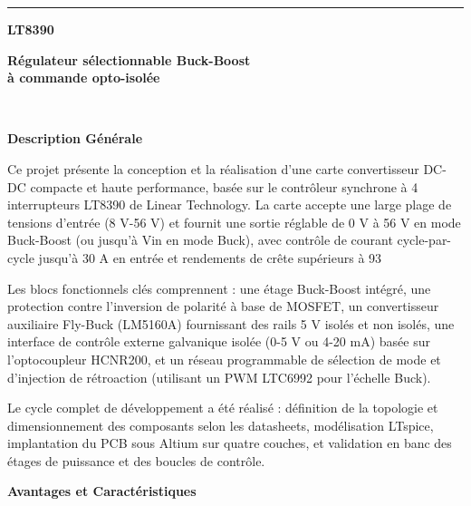\begin{titlepage}
	\noindent\rule{\textwidth}{1pt}
    \noindent
    \begin{minipage}[t]{0.48\textwidth}
      \textbf{LT8390}
    \end{minipage}%
    \hfill%
    \begin{minipage}[t]{0.48\textwidth}
      \raggedleft
      \textbf{Régulateur sélectionnable Buck-Boost} \\
	  \textbf{à commande opto-isolée}
    \end{minipage}\\[0.5em]

    \vspace{1cm}

    \noindent
    \begin{minipage}[t]{0.48\textwidth}
	\textbf{Description Générale}

	\vspace{0.5cm}

	Ce projet présente la conception et la réalisation d'une carte convertisseur DC-DC compacte et haute performance, basée sur le contrôleur synchrone à 4 interrupteurs LT8390 de Linear Technology. La carte accepte une large plage de tensions d'entrée (8 V-56 V) et fournit une sortie réglable de 0 V à 56 V en mode Buck-Boost (ou jusqu'à Vin en mode Buck), avec contrôle de courant cycle-par-cycle jusqu'à 30 A en entrée et rendements de crête supérieurs à 93 %

	\vspace{0.3cm}

	Les blocs fonctionnels clés comprennent : une étage Buck-Boost intégré, une protection contre l'inversion de polarité à base de MOSFET, un convertisseur auxiliaire Fly-Buck (LM5160A) fournissant des rails 5 V isolés et non isolés, une interface de contrôle externe galvanique isolée (0-5 V ou 4-20 mA) basée sur l'optocoupleur HCNR200, et un réseau programmable de sélection de mode et d'injection de rétroaction (utilisant un PWM LTC6992 pour l'échelle Buck).

	\vspace{0.3cm}

	Le cycle complet de développement a été réalisé : définition de la topologie et dimensionnement des composants selon les datasheets, modélisation LTspice, implantation du PCB sous Altium sur quatre couches, et validation en banc des étages de puissance et des boucles de contrôle.

	\end{minipage}%
	\hfill%
	\begin{minipage}[t]{0.48\textwidth}
	\textbf{Avantages et Caractéristiques}


\end{minipage}
\end{titlepage}
